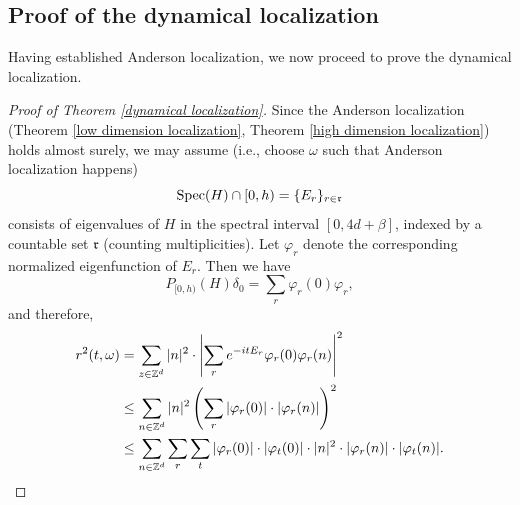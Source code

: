 \documentclass[11pt,reqno,UTF8,twoside]{amsart}
\newcommand{\Z}{\mathbb{Z}}
\newcommand{\spec}{{\rm Spec}}
\theoremstyle{definition}
\numberwithin{equation}{section}
\begin{document}
\subsection{Proof of the dynamical localization}
Having established Anderson localization, we now proceed to prove the dynamical localization.
\begin{proof}[Proof of Theorem \ref{dynamical localization}]
Since the Anderson localization (Theorem \ref{low dimension localization}, Theorem \ref{high dimension localization}) holds almost surely, we may assume (i.e.,  choose $\omega$ such that Anderson localization happens)
\[\spec(H)\cap [0,h) = \{E_r\}_{r \in \mathfrak{r}} \]
consists of eigenvalues of $H$ in the spectral interval $[0,4d+\beta]$, indexed by a countable set $\mathfrak{r}$ (counting multiplicities). Let $\varphi_r$ denote the corresponding normalized eigenfunction  of $E_r$. Then we have 
\[P_{[0,h)}(H)\delta_0 =\sum_{r} \varphi_r(0) \varphi_r,\]
and therefore,
\begin{align}\label{MSD}
  r^2(t,\omega) &= \sum_{z\in \Z^d} |n|^2 \cdot \left|  \sum_{r} e^{-itE_r}\varphi_r(0)\varphi_r(n) \right|^2 \\
  \notag & \leq \sum_{n\in \Z^d}|n|^2 \left(\sum_r |\varphi_r(0)|\cdot |\varphi_r(n)|\right)^2 \\
  \notag  & \leq \sum_{n\in \Z^d} \sum_{r} \sum_{t} |\varphi_r(0)| \cdot |\varphi_t(0)| \cdot |n|^2 \cdot |\varphi_r(n)|\cdot |\varphi_t(n)|.
\end{align}


\end{proof}
\end{document}
